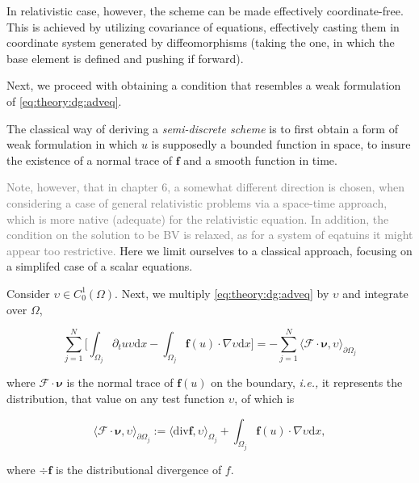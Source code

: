 In relativistic case, however, the scheme can be made effectively coordinate-free. This is achieved by utilizing covariance of equations, effectively casting them in coordinate system generated by diffeomorphisms (taking the one, in which the base element is defined and pushing if forward). 

Next, we proceed with obtaining a condition that resembles a weak formulation of \ref{eq:theory:dg:adveq}. 

The classical way of deriving a \textit{semi-discrete scheme} is to first obtain a form of weak formulation in which $u$ is supposedly a bounded function in space, to insure the existence of a normal trace of $\boldsymbol{f}$ and a smooth function in time. 

\textcolor{gray}{Note, however, that in chapter 6, a somewhat different direction is chosen, when considering a case of general relativistic problems via a space-time approach, which is more native (adequate) for the relativistic equation. In addition, the condition on the solution to be BV is relaxed, as for a system of eqatuins it might appear too restrictive.} 
Here we limit ourselves to a classical approach, focusing on a simplifed case of a scalar equations. 

Consider $\upsilon \in C_0 ^1(\Omega)$. 
Next, we multiply \ref{eq:theory:dg:adveq} by $\upsilon$ and integrate over $\Omega$, 

\begin{equation}
\sum_{j=1}^{N}\Bigg[\int_{\Omega_j}\partial_{t}u\upsilon\text{d}x - \int_{\Omega_j}\boldsymbol{f}(u)\cdot\nabla\upsilon\text{d}x\Bigg] = -\sum_{j=1}^{N}\langle\boldsymbol{\mathcal{F}}\cdot\boldsymbol{\nu},\upsilon\rangle_{\partial\Omega_j}
\label{eq:theory:dg:intformadveq}
\end{equation}

where $\boldsymbol{\mathcal{F}}\cdot\boldsymbol{\nu}$ is the normal trace of $\boldsymbol{f}(u)$ on the boundary, \textit{i.e.,} it represents the distribution, that value on any test function $\upsilon$, of which is 

\begin{equation}
\langle\boldsymbol{\mathcal{F}}\cdot\boldsymbol{\nu},\upsilon\rangle_{\partial\Omega_j} := \langle\text{div}\boldsymbol{f},\upsilon\rangle_{\Omega_j} + \int_{\Omega_j}\boldsymbol{f}(u)\cdot\nabla\upsilon\text{d}x,
\end{equation} 

where $\div\boldsymbol{f}$ is the distributional divergence of $f$. 

